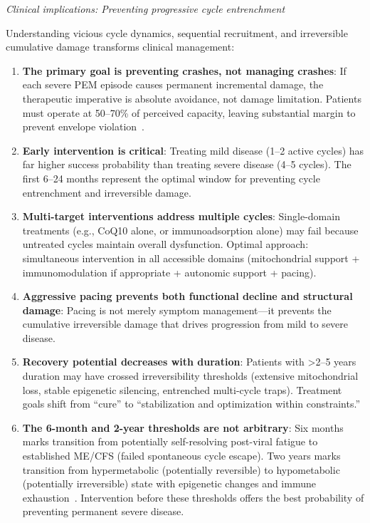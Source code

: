 \textit{Clinical implications: Preventing progressive cycle entrenchment}

Understanding vicious cycle dynamics, sequential recruitment, and irreversible cumulative damage transforms clinical management:

\begin{enumerate}
    \item \textbf{The primary goal is preventing crashes, not managing crashes}: If each severe PEM episode causes permanent incremental damage, the therapeutic imperative is absolute avoidance, not damage limitation. Patients must operate at 50--70\% of perceived capacity, leaving substantial margin to prevent envelope violation~\cite{jason2012energy}.

    \item \textbf{Early intervention is critical}: Treating mild disease (1--2 active cycles) has far higher success probability than treating severe disease (4--5 cycles). The first 6--24 months represent the optimal window for preventing cycle entrenchment and irreversible damage.

    \item \textbf{Multi-target interventions address multiple cycles}: Single-domain treatments (e.g., CoQ10 alone, or immunoadsorption alone) may fail because untreated cycles maintain overall dysfunction. Optimal approach: simultaneous intervention in all accessible domains (mitochondrial support + immunomodulation if appropriate + autonomic support + pacing).

    \item \textbf{Aggressive pacing prevents both functional decline and structural damage}: Pacing is not merely symptom management---it prevents the cumulative irreversible damage that drives progression from mild to severe disease.

    \item \textbf{Recovery potential decreases with duration}: Patients with >2--5 years duration may have crossed irreversibility thresholds (extensive mitochondrial loss, stable epigenetic silencing, entrenched multi-cycle traps). Treatment goals shift from ``cure'' to ``stabilization and optimization within constraints.''

    \item \textbf{The 6-month and 2-year thresholds are not arbitrary}: Six months marks transition from potentially self-resolving post-viral fatigue to established ME/CFS (failed spontaneous cycle escape). Two years marks transition from hypermetabolic (potentially reversible) to hypometabolic (potentially irreversible) state with epigenetic changes and immune exhaustion~\cite{Maksoud2020natural}. Intervention before these thresholds offers the best probability of preventing permanent severe disease.
\end{enumerate}

